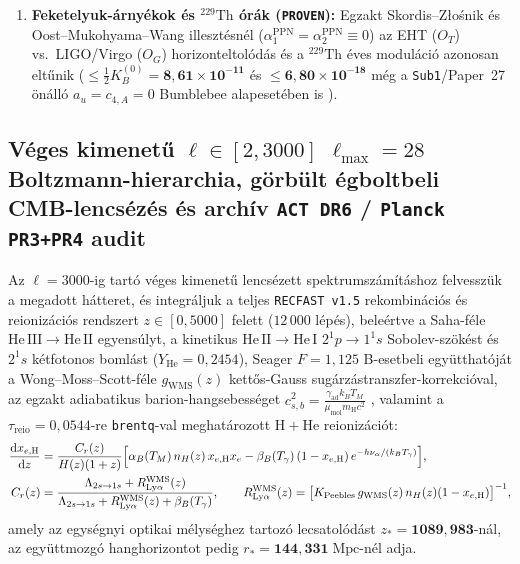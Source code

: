 \documentclass[11pt,a4paper]{article}
\begin{document}
\begin{enumerate}
  \item \textbf{Feketelyuk-árnyékok és $^{229}\mathrm{Th}$ órák ({\upshape\texttt{PROVEN}}):} Egzakt Skordis--Z\l{}o\'snik és Oost--Mukohyama--Wang illesztésnél ($\alpha_1^{\mathrm{PPN}} = \alpha_2^{\mathrm{PPN}} \equiv 0$) az EHT ($O_T$) vs.\ LIGO/Virgo ($O_G$) horizonteltolódás és a $^{229}\mathrm{Th}$ éves moduláció azonosan eltűnik ($\le \frac{1}{2}K_B^{(0)} = \mathbf{8{,}61\times 10^{-11}}$ és $\le \mathbf{6{,}80\times 10^{-18}}$ még a {\upshape\texttt{Sub1}}/Paper~27 önálló $a_u = c_{4,A} = 0$ Bumblebee alapesetében is \cite{Lange2021,Tiedau2024Th229}).
\end{enumerate}

\subsection{Véges kimenetű \texorpdfstring{$\ell \in [2, 3000]$}{l in [2, 3000]} \texorpdfstring{$\ell_{\max} = 28$}{l\_max = 28} Boltzmann-hierarchia, görbült égboltbeli CMB-lencsézés és archív \texttt{ACT DR6} / \texttt{Planck PR3+PR4} audit}
Az $\ell=3000$-ig tartó véges kimenetű lencsézett spektrumszámításhoz felvesszük a megadott hátteret, és integráljuk a teljes \texttt{RECFAST v1.5} rekombinációs és reionizációs rendszert \cite{Peebles1968,Seager1999RECFAST,WongMossScott2008} $z \in [0, 5000]$ felett ($12\,000$ lépés), beleértve a Saha-féle $\mathrm{He\,III}\to\mathrm{He\,II}$ egyensúlyt, a kinetikus $\mathrm{He\,II}\to\mathrm{He\,I}$ $2^1p\to 1^1s$ Sobolev-szökést és $2^1s$ kétfotonos bomlást ($Y_{\mathrm{He}} = 0{,}2454$), Seager $F = 1{,}125$ B-esetbeli együtthatóját a Wong--Moss--Scott-féle $g_{\mathrm{WMS}}(z)$ kettős-Gauss sugárzástranszfer-korrekcióval, az egzakt adiabatikus barion-hangsebességet $c_{s,b}^2 = \frac{\gamma_{\mathrm{ad}}k_B T_M}{\mu_{\mathrm{mol}}m_{\mathrm{H}}c^2}$ \cite{MaBertschinger1995}, valamint a $\tau_{\mathrm{reio}} = 0{,}0544$-re \texttt{brentq}-val meghatározott $\mathrm{H}+\mathrm{He}$ reionizációt:
\begin{equation}
\begin{aligned}
  \frac{\mathrm{d}x_{e,\mathrm{H}}}{\mathrm{d}z} &= \frac{C_r(z)}{H(z)(1+z)}\Bigl[\alpha_B(T_M)\,n_H(z)\,x_{e,\mathrm{H}} x_e - \beta_B(T_\gamma)\,(1 - x_{e,\mathrm{H}})\,e^{-h\nu_\alpha/(k_B T_\gamma)}\Bigr], \\
  C_r(z) &= \frac{\Lambda_{2s\to 1s} + R_{\mathrm{Ly}\alpha}^{\mathrm{WMS}}(z)}{\Lambda_{2s\to 1s} + R_{\mathrm{Ly}\alpha}^{\mathrm{WMS}}(z) + \beta_B(T_\gamma)}, \qquad R_{\mathrm{Ly}\alpha}^{\mathrm{WMS}}(z) = \bigl[K_{\mathrm{Peebles}}\,g_{\mathrm{WMS}}(z)\,n_H(z)(1 - x_{e,\mathrm{H}})\bigr]^{-1},
\end{aligned}
\label{eq:recfast}
\end{equation}
amely az egységnyi optikai mélységhez tartozó lecsatolódást $z_* = \mathbf{1089{,}983}$-nál, az együttmozgó hanghorizontot pedig $r_* = \mathbf{144{,}331\;\mathrm{Mpc}}$-nél adja.
\end{document}
